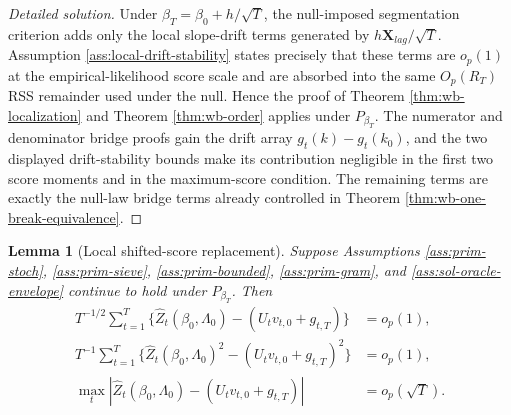 \documentclass[12pt]{article}
\numberwithin{equation}{section}
\newtheorem{lemma}{Lemma}
\theoremstyle{definition}
\begin{document}
\begin{proof}[Detailed solution]
Under \(\beta_T=\beta_0+h/\sqrt T\), the null-imposed segmentation criterion
adds only the local slope-drift terms generated by \(h\bm X_{lag}/\sqrt T\).
Assumption \ref{ass:local-drift-stability} states precisely that these terms
are \(o_p(1)\) at the empirical-likelihood score scale and are absorbed into the
same \(O_p(R_T)\) RSS remainder used under the null.  Hence the proof of
Theorem \ref{thm:wb-localization} and Theorem \ref{thm:wb-order} applies under
\(P_{\beta_T}\).  The numerator and denominator bridge proofs gain the drift
array \(g_t(k)-g_t(k_0)\), and the two displayed drift-stability bounds make its
contribution negligible in the first two score moments and in the maximum-score
condition.  The remaining terms are exactly the null-law bridge terms already
controlled in Theorem \ref{thm:wb-one-break-equivalence}.
\end{proof}

\begin{lemma}[Local shifted-score replacement]
\label{lem:wb-local-replacement}
Suppose Assumptions \ref{ass:prim-stoch}, \ref{ass:prim-sieve},
\ref{ass:prim-bounded}, \ref{ass:prim-gram}, and
\ref{ass:sol-oracle-envelope} continue to hold under \(P_{\beta_T}\).  Then
\begin{align}
    T^{-1/2}\sum_{t=1}^T
    \{\widehat Z_t(\beta_0,\Lambda_0)-(U_tv_{t,0}+g_{t,T})\}
    &=o_p(1),
    \\
    T^{-1}\sum_{t=1}^T
    \{\widehat Z_t(\beta_0,\Lambda_0)^2-(U_tv_{t,0}+g_{t,T})^2\}
    &=o_p(1),
    \\
    \max_t|\widehat Z_t(\beta_0,\Lambda_0)-(U_tv_{t,0}+g_{t,T})|
    &=o_p(\sqrt T).
\end{align}
\end{lemma}
\end{document}
